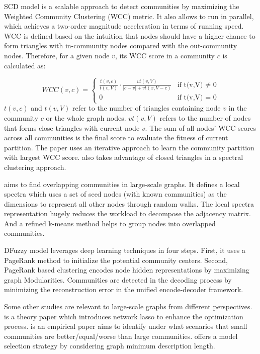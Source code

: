 SCD model \cite{prat2014high} is a scalable approach to detect communities by maximizing the Weighted  Community Clustering (WCC) metric. It also allows to run in parallel, which achieves a two-order magnitude acceleration in terms of running speed. WCC is defined based on the intuition that nodes should have a higher chance to form triangles with in-community nodes compared with the out-community nodes. Therefore, for a given node $v$, its WCC score in a community $c$ is calculated as:

\begin{equation}
WCC(v,c) = 
\begin{cases}
\frac{t(v,c)}{t(v,V)} \cdot \frac{vt(v,V)}{|c - v| + vt(x, V-c)} & \text{if t(v,V) $\neq$ 0}\\
0& \text{if t(v,V) = 0}
\end{cases}
\end{equation}
$t(v,c)$ and $t(v,V)$ refer to the number of triangles containing node $v$ in the community $c$ or the whole graph nodes. $vt(v,V)$ refers to the number of nodes that forms close triangles with current node $v$. The sum of all nodes' WCC scores across all communities is the final score to evaluate the fitness of current partition. The paper uses an iterative approach to learn the community partition with largest WCC score. \cite{tsourakakis2017scalable} also takes advantage of closed triangles in a spectral clustering approach.

\cite{li2015uncovering} aims to find overlapping communities in large-scale graphs. It defines a local spectra which uses a set of seed nodes (with known communities) as the dimensions to represent all other nodes through random walks. The local spectra representation hugely reduces the workload to decompose the adjacency matrix. And a refined k-means method helps to group nodes into overlapped communities. 

DFuzzy model \cite{bhatia2018dfuzzy} leverages deep learning techniques in four steps. First, it uses a PageRank method to initialize the potential community centers. Second,  PageRank based clustering encodes node hidden representations by maximizing graph Modularities. Communities are detected in the decoding process by minimizing the reconstruction error in the unified encode-decoder framework.

Some other studies are relevant to large-scale graphs from different perspectives. \cite{hallac2015network} is a theory paper which introduces network lasso to enhance the optimization process. \cite{jeub2015think} is an empirical paper aims to identify under what scenarios that small communities are better/equal/worse than large communities. \cite{peixoto2015model} offers a model selection strategy by considering graph minimum description length. 

